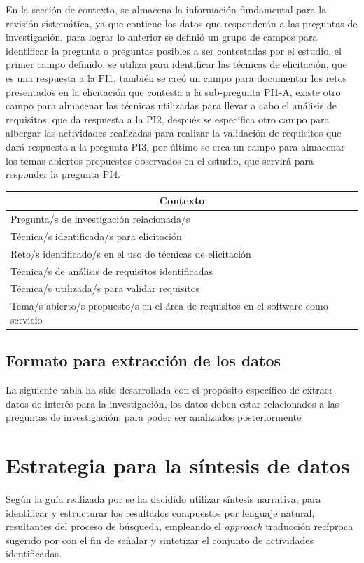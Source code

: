 \documentclass{article}
\begin{document}
En la sección de contexto, se almacena la información fundamental para la revisión sistemática, ya que contiene los datos que responderán a las
preguntas de investigación, para lograr lo anterior se definió un grupo de campos para identificar la pregunta o preguntas posibles a ser contestadas 
por el estudio, el primer campo definido, se utiliza para identificar las técnicas de elicitación, que es una respuesta a la PI1, también se creó un campo para 
documentar los retos presentados en la elicitación que contesta a la sub-pregunta PI1-A, existe otro campo para almacenar las técnicas utilizadas para llevar a cabo 
el análisis de requisitos, que da respuesta a la PI2, después se especifica otro campo para albergar las actividades realizadas para realizar la validación de requisitos que 
dará respuesta a la pregunta PI3, por último se crea un campo para almacenar los temas abiertos propuestos observados en el estudio, que servirá para responder la pregunta PI4.

\begin{center}
\begin{tabular}{ |l|l| }
\hline
    \multicolumn{2}{|c|}{Contexto} \\
    \hline
    Pregunta/s de investigación relacionada/s & \\
    \hline
    Técnica/s identificada/s para elicitación& \\
    \hline
    Reto/s identificado/s en el uso de técnicas de elicitación& \\
    \hline
    Técnica/s de análisis de requisitos identificadas& \\
    \hline
    Técnica/s utilizada/s para validar requisitos & \\
    \hline
    Tema/s abierto/s propuesto/s en el área de requisitos en el software como servicio& \\
 \hline
\end{tabular}
\end{center}


\subsection{Formato para extracción de los datos}
La siguiente tabla ha sido desarrollada con el propósito específico de extraer datos de interés para la investigación, 
los datos deben estar relacionados a las preguntas de investigación, para poder ser analizados posteriormente 


\section{Estrategia para la síntesis de datos}
Según la guía realizada por \cite{kitchenham2007guidelines} se ha decidido utilizar síntesis narrativa, para identificar y estructurar los resultados compuestos por 
lenguaje natural, resultantes del proceso de búsqueda, empleando el \emph{approach} traducción recíproca sugerido por \cite{popay2006guidance}  con el fin de señalar 
y sintetizar el conjunto de actividades identificadas.
\newpage
\end{document}
